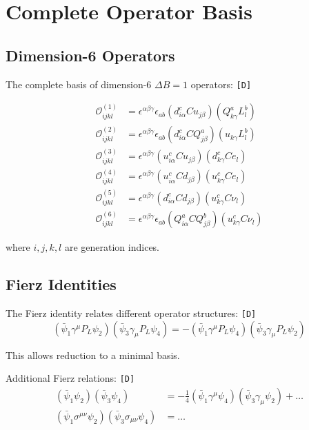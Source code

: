 \documentclass[11pt,a4paper]{article}
\newcommand{\tagD}{\textcolor{green!50!black}{\texttt{[D]}}}
\theoremstyle{definition}
\begin{document}
\section{Complete Operator Basis}
\label{app:operators}

\subsection{Dimension-6 Operators}
\label{app:dim6}

The complete basis of dimension-6 $\Delta B = 1$ operators: \tagD{}

\begin{align}
\label{eq:o1-full}
\mathcal{O}^{(1)}_{ijkl} &= \epsilon^{\alpha\beta\gamma} \epsilon_{ab}
(d^c_{i\alpha} C u_{j\beta})(Q^a_{k\gamma} L^b_l) \\
\label{eq:o2-full}
\mathcal{O}^{(2)}_{ijkl} &= \epsilon^{\alpha\beta\gamma} \epsilon_{ab}
(d^c_{i\alpha} C Q^a_{j\beta})(u_{k\gamma} L^b_l) \\
\label{eq:o3-full}
\mathcal{O}^{(3)}_{ijkl} &= \epsilon^{\alpha\beta\gamma}
(u^c_{i\alpha} C u_{j\beta})(d^c_{k\gamma} C e_l) \\
\label{eq:o4-full}
\mathcal{O}^{(4)}_{ijkl} &= \epsilon^{\alpha\beta\gamma}
(u^c_{i\alpha} C d_{j\beta})(u^c_{k\gamma} C e_l) \\
\label{eq:o5-full}
\mathcal{O}^{(5)}_{ijkl} &= \epsilon^{\alpha\beta\gamma}
(d^c_{i\alpha} C d_{j\beta})(u^c_{k\gamma} C \nu_l) \\
\label{eq:o6-full}
\mathcal{O}^{(6)}_{ijkl} &= \epsilon^{\alpha\beta\gamma} \epsilon_{ab}
(Q^a_{i\alpha} C Q^b_{j\beta})(u^c_{k\gamma} C \nu_l)
\end{align}

where $i,j,k,l$ are generation indices.

\subsection{Fierz Identities}
\label{app:fierz}

The Fierz identity relates different operator structures: \tagD{}
\begin{equation}
\label{eq:fierz}
(\bar{\psi}_1 \gamma^\mu P_L \psi_2)(\bar{\psi}_3 \gamma_\mu P_L \psi_4) =
-(\bar{\psi}_1 \gamma^\mu P_L \psi_4)(\bar{\psi}_3 \gamma_\mu P_L \psi_2)
\end{equation}

This allows reduction to a minimal basis.

Additional Fierz relations: \tagD{}
\begin{align}
\label{eq:fierz-scalar}
(\bar{\psi}_1 \psi_2)(\bar{\psi}_3 \psi_4) &= -\frac{1}{4}(\bar{\psi}_1 \gamma^\mu \psi_4)(\bar{\psi}_3 \gamma_\mu \psi_2)
+ \ldots \\
\label{eq:fierz-tensor}
(\bar{\psi}_1 \sigma^{\mu\nu} \psi_2)(\bar{\psi}_3 \sigma_{\mu\nu} \psi_4) &= \ldots
\end{align}
\end{document}
